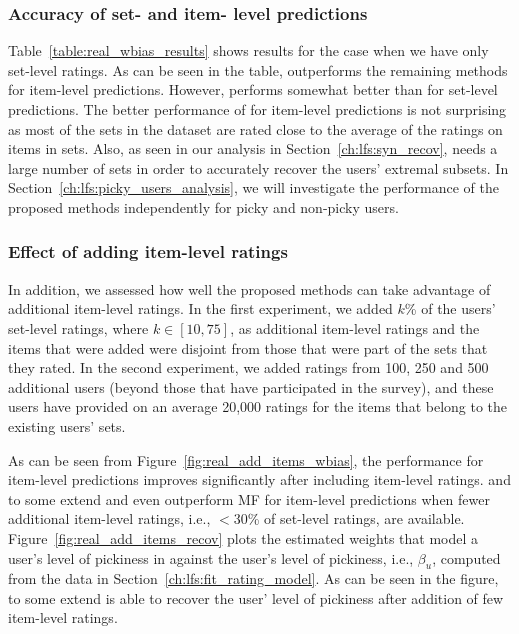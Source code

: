 \subsubsection{Accuracy of set- and item- level predictions}
Table~\ref{table:real_wbias_results} shows results for the case when we have
only set-level ratings. 
As can be seen in the table, \ARM outperforms the remaining methods for item-level 
predictions. However, \VO performs somewhat better than \ARM for set-level predictions. The better performance
of \ARM for item-level predictions is not surprising as most of the sets in the dataset
are rated close to the average of the ratings on items in sets. Also, as seen in
our analysis in Section~\ref{ch:lfs:syn_recov}, \ES needs a large number of sets
in order to accurately recover the users' extremal subsets. In
Section~\ref{ch:lfs:picky_users_analysis}, we will investigate the performance of the
proposed methods independently for picky and non-picky users.  


\subsubsection{Effect of adding item-level ratings}
In addition, we assessed how
well the proposed methods can take advantage of additional item-level
ratings. 
In the first experiment, we added $k$\% of the users' set-level ratings, where $k
\in [10, 75]$, as additional item-level ratings and the items that were added 
were disjoint from those that were part of the sets that they rated. 
In the second experiment, we added ratings from 100, 250 and 500 additional users (beyond
those that have participated in the survey), and these users have provided on an
average 20,000 ratings for the items that belong to the existing users' sets.

As can be seen from Figure~\ref{fig:real_add_items_wbias}, the  performance for
item-level predictions improves significantly after including item-level
ratings. 
\ARM and to some extend \ES and \VO even outperform  MF for item-level
predictions when fewer additional item-level ratings, i.e., $< 30$\% of
set-level ratings, are available.
Figure~\ref{fig:real_add_items_recov} plots the estimated weights that model a
user's level of pickiness in \VO against the user's level of pickiness, i.e.,
$\beta_u$, computed
from the data in Section~\ref{ch:lfs:fit_rating_model}. As can be seen in the figure, to some
extend \VO is
able to recover the user' level of pickiness after addition of few item-level
ratings.


